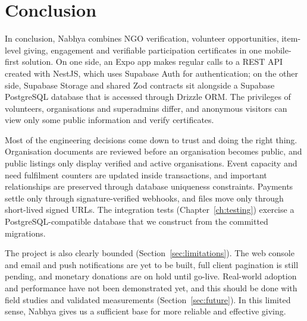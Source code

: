 \chapter{Conclusion}
\label{ch:conclusion}

In conclusion, Nabhya combines NGO verification, volunteer opportunities, item-level giving, engagement and verifiable participation certificates in one mobile-first solution. On one side, an Expo app makes regular calls to a REST API created with NestJS, which uses Supabase Auth for authentication; on the other side, Supabase Storage and shared Zod contracts sit alongside a Supabase PostgreSQL database that is accessed through Drizzle ORM. The privileges of volunteers, organisations and superadmins differ, and anonymous visitors can view only some public information and verify certificates.

Most of the engineering decisions come down to trust and doing the right thing. Organisation documents are reviewed before an organisation becomes public, and public listings only display verified and active organisations. Event capacity and need fulfilment counters are updated inside transactions, and important relationships are preserved through database uniqueness constraints. Payments settle only through signature-verified webhooks, and files move only through short-lived signed URLs. The integration tests (Chapter~\ref{ch:testing}) exercise a PostgreSQL-compatible database that we construct from the committed migrations.

The project is also clearly bounded (Section~\ref{sec:limitations}). The web console and email and push notifications are yet to be built, full client pagination is still pending, and monetary donations are on hold until go-live. Real-world adoption and performance have not been demonstrated yet, and this should be done with field studies and validated measurements (Section~\ref{sec:future}). In this limited sense, Nabhya gives us a sufficient base for more reliable and effective giving.

